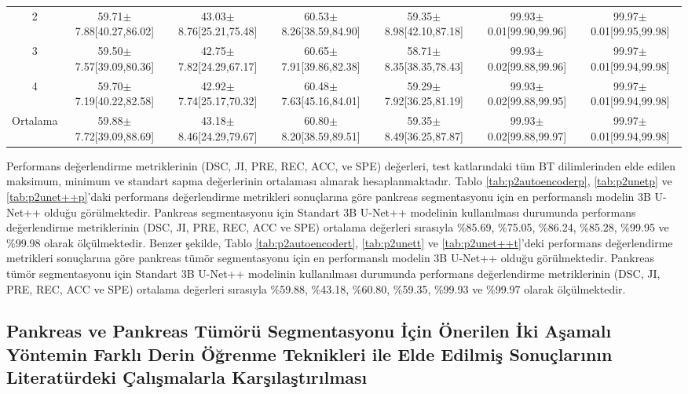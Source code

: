 \begin{table}
\begin{adjustbox}{width=\textwidth}
\begin{tabular}{ccccccc}
            2 & 59.71$\pm$7.88[40.27,86.02] & 43.03$\pm$8.76[25.21,75.48] & 60.53$\pm$8.26[38.59,84.90] & 59.35$\pm$8.98[42.10,87.18] & 99.93$\pm$0.01[99.90,99.96] & 99.97$\pm$0.01[99.95,99.98] \\
            3 & 59.50$\pm$7.57[39.09,80.36] & 42.75$\pm$7.82[24.29,67.17] & 60.65$\pm$7.91[39.86,82.38] & 58.71$\pm$8.35[38.35,78.43] & 99.93$\pm$0.02[99.88,99.96] & 99.97$\pm$0.01[99.94,99.98] \\
            4 & 59.70$\pm$7.19[40.22,82.58] & 42.92$\pm$7.74[25.17,70.32] & 60.48$\pm$7.63[45.16,84.01] & 59.29$\pm$7.92[36.25,81.19] & 99.93$\pm$0.02[99.88,99.95] & 99.97$\pm$0.01[99.94,99.98] \\
			\toprule
			Ortalama & 59.88$\pm$7.72[39.09,88.69] & 43.18$\pm$8.46[24.29,79.67] & 60.80$\pm$8.20[38.59,89.51] & 59.35$\pm$8.49[36.25,87.87] & 99.93$\pm$0.02[99.88,99.97] & 99.97$\pm$0.01[99.94,99.98] \\					
			\bottomrule			
		\end{tabular}
	\end{adjustbox}	
\end{table}

Performans değerlendirme metriklerinin (DSC, JI, PRE, REC, ACC, ve SPE) değerleri, test katlarındaki tüm BT dilimlerinden elde edilen maksimum, minimum ve standart sapma değerlerinin ortalaması alınarak hesaplanmaktadır. Tablo \ref{tab:p2autoencoderp}, \ref{tab:p2unetp} ve \ref{tab:p2unet++p}'daki performans değerlendirme metrikleri sonuçlarına göre pankreas segmentasyonu için en performanslı modelin 3B U-Net++ olduğu görülmektedir. Pankreas segmentasyonu için Standart 3B U-Net++ modelinin kullanılması durumunda performans değerlendirme metriklerinin (DSC, JI, PRE, REC, ACC ve SPE) ortalama değerleri sırasıyla \%85.69, \%75.05, \%86.24, \%85.28, \%99.95 ve \%99.98 olarak ölçülmektedir. Benzer şekilde, Tablo \ref{tab:p2autoencodert}, \ref{tab:p2unett} ve \ref{tab:p2unet++t}'deki performans değerlendirme metrikleri sonuçlarına göre pankreas tümör segmentasyonu için en performanslı modelin 3B U-Net++ olduğu görülmektedir. Pankreas tümör segmentasyonu için Standart 3B U-Net++ modelinin kullanılması durumunda performans değerlendirme metriklerinin (DSC, JI, PRE, REC, ACC ve SPE) ortalama değerleri sırasıyla \%59.88, \%43.18, \%60.80, \%59.35, \%99.93 ve \%99.97 olarak ölçülmektedir.

\subsection{Pankreas ve Pankreas Tümörü Segmentasyonu İçin Önerilen İki Aşamalı Yöntemin Farklı Derin Öğrenme Teknikleri ile Elde Edilmiş Sonuçlarının Literatürdeki Çalışmalarla Karşılaştırılması}

